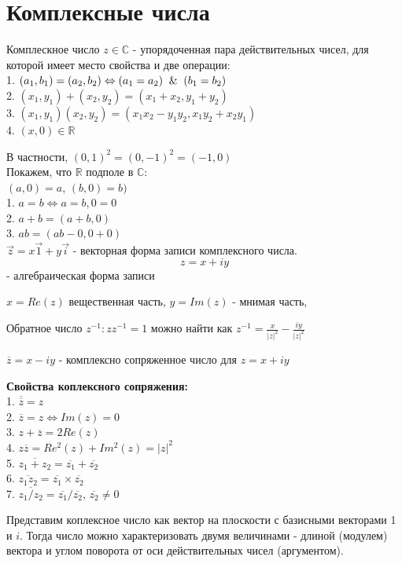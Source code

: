 \section{Комплексные числа}
\begin{defin}
Комплескное число $z\in\mathbb C$ - упорядоченная пара действительных чисел,
для которой имеет место свойства и две операции:\\
1. $(a_1,b_1)=(a_2,b_2)\Leftrightarrow(a_1=a_2)\And(b_1=b_2)$\\
2. $(x_1,y_1)+(x_2,y_2)=(x_1+x_2,y_1+y_2)$\\
3. $(x_1,y_1)(x_2,y_2)=(x_1x_2-y_1y_2,x_1y_2+x_2y_1)$\\
4. $(x,0)\in\mathbb{R}$
\end{defin}
В частности, $(0,1)^2=(0,-1)^2=(-1,0)$\\
Покажем, что $\mathbb{R}$ подполе в $\mathbb{C}$:\\
$(a,0)=a$, $(b,0)=b)$\\
1. $a=b\Leftrightarrow a=b, 0=0$\\
2. $a+b=(a+b,0)$\\
3. $ab=(ab-0,0+0)$\\
$\Vec{z}=x\Vec{1}+y\Vec{i}$ - векторная форма записи комплексного числа.\\
$$\boxed{z=x+iy}$$ - алгебраическая форма записи

$x=Re(z)$ вещественная часть, $y=Im(z)$ - мнимая часть, 

Обратное число $z^{-1}\colon zz^{-1}=1$ можно найти как
$z^{-1}=\frac{x}{|z|^2}-\frac{iy}{|z|^2}$

\begin{defin}
$\overline{z}=x-iy$ - комплексно сопряженное число для $z=x+iy$
\end{defin}
\textbf{Свойства коплексного сопряжения:}\\
1. $\overline{\overline{z}}=z$\\
2. $\overline{z}=z\Leftrightarrow Im(z)=0$\\
3. $z+\overline{z}=2 Re(z)$\\
4. $z\overline{z}=Re^2(z)+Im^2(z)=|z|^2$\\
5. $\overline{z_1+z_2}=\overline{z_1}+\overline{z_2}$\\
6. $\overline{z_1z_2}=\overline{z_1}\times\overline{z_2}$\\
7. $\overline{z_1/z_2}=\overline{z_1}/\overline{z_2}$, $\overline{z_2}\ne0$

Представим коплексное число как вектор на плоскости с базисными векторами 1
и $i$. Тогда число можно характеризовать двумя величинами - длиной (модулем)
вектора и углом поворота от оси действительных чисел (аргументом). 


